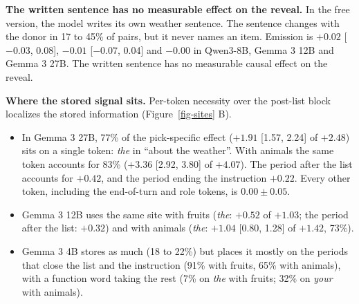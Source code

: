 \documentclass[
]{article}
\providecommand{\tightlist}{%
  \setlength{\itemsep}{0pt}\setlength{\parskip}{0pt}}
\begin{document}
\begin{table}

\caption{\label{tbl-hidden}Stored pick-specific information: pick
specificity of the post-list edit as a share of the text-swap pick
specificity (100 pairs per cell; values with 95\% intervals in Appendix
Section~\ref{sec-app-hidden}). Fruits: specificity added post hoc.
Animals: committed before the result.}


\end{table}%

\textbf{The written sentence has no measurable effect on the reveal.} In
the free version, the model writes its own weather sentence. The
sentence changes with the donor in 17 to 45\% of pairs, but it never
names an item. Emission is \(+0.02\) {[}\(-0.03\), 0.08{]}, \(-0.01\)
{[}\(-0.07\), 0.04{]} and \(-0.00\) in Qwen3-8B, Gemma 3 12B and Gemma 3
27B. The written sentence has no measurable causal effect on the reveal.

\textbf{Where the stored signal sits.} Per-token necessity over the
post-list block localizes the stored information (Figure~\ref{fig-sites}
B).

\begin{itemize}
\tightlist
\item
  In Gemma 3 27B, 77\% of the pick-specific effect (\(+1.91\) {[}1.57,
  2.24{]} of \(+2.48\)) sits on a single token: \emph{the} in ``about
  the weather''. With animals the same token accounts for 83\%
  (\(+3.36\) {[}2.92, 3.80{]} of \(+4.07\)). The period after the list
  accounts for \(+0.42\), and the period ending the instruction
  \(+0.22\). Every other token, including the end-of-turn and role
  tokens, is \(0.00\pm0.05\).
\item
  Gemma 3 12B uses the same site with fruits (\emph{the}: \(+0.52\) of
  \(+1.03\); the period after the list: \(+0.32\)) and with animals
  (\emph{the}: \(+1.04\) {[}0.80, 1.28{]} of \(+1.42\), 73\%).
\item
  Gemma 3 4B stores as much (18 to 22\%) but places it mostly on the
  periods that close the list and the instruction (91\% with fruits,
  65\% with animals), with a function word taking the rest (7\% on
  \emph{the} with fruits; 32\% on \emph{your} with animals).
\end{itemize}
\end{document}
